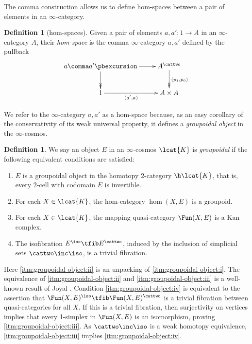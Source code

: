 \documentclass[12pt,reqno]{amsart}
\theoremstyle{plain}
\theoremstyle{definition}
\newtheorem{defn}[thm]{Definition}
\theoremstyle{remark}
\numberwithin{equation}{subsection}
\begin{document}
The comma construction allows us to define hom-spaces between a pair of elements in an $\infty$-category.

\begin{defn}[hom-spaces]\label{defn:hom-space} Given a pair of elements $a,a' \colon 1\to A$ in an $\infty$-category $A$, their \emph{hom-space} is the comma $\infty$-category $a \comma a'$ defined by the pullback
\[ \xymatrix{ a \comma a' \ar@{->>}[d] \ar[r] \pbexcursion & A^\cattwo \ar@{->>}[d]^{(p_1,p_0)} \\ 1 \ar[r]_-{(a',a)} & A \times A}\] 
\end{defn}

We refer to the $\infty$-category $a \comma a'$ as a hom-space because, as an easy corollary of the conservativity of its weak universal property,  it defines a \emph{groupoidal object} in the $\infty$-cosmos.

\begin{defn}\label{defn:groupoidal-object} We say an object $E$ in an $\infty$-cosmos $\lcat{K}$ is \emph{groupoidal} if the following equivalent conditions are satisfied:
\begin{enumerate}[label=(\roman*)]
\item\label{itm:groupoidal-object:i} $E$ is a groupoidal object in the homotopy 2-category $\h\lcat{K}$, that is,  every 2-cell with codomain $E$ is invertible.
\item\label{itm:groupoidal-object:ii} For each $X \in \lcat{K}$, the hom-category $\hom(X,E)$ is a groupoid. 
\item\label{itm:groupoidal-object:iii}  For each $X \in \lcat{K}$, the mapping quasi-category $\Fun(X,E)$ is a Kan complex.
\item\label{itm:groupoidal-object:iv} The isofibration $E^\iso \tfib E^\cattwo$, induced by the inclusion of simplicial sets $\cattwo\inc\iso$, is a trivial fibration.
\end{enumerate}
Here \ref{itm:groupoidal-object:ii} is an unpacking of \ref{itm:groupoidal-object:i}. The equivalence of \ref{itm:groupoidal-object:ii} and \ref{itm:groupoidal-object:iii} is a well-known result of Joyal \cite[1.4]{Joyal:2002:QuasiCategories}. Condition \ref{itm:groupoidal-object:iv} is equivalent to the assertion that $\Fun(X,E)^\iso \tfib \Fun(X,E)^\cattwo$ is a trivial fibration between quasi-categories for all $X$. If this is a trivial fibration, then surjectivity on vertices implies that every 1-simplex in $\Fun(X,E)$ is an isomorphism, proving \ref{itm:groupoidal-object:iii}. As $\cattwo \inc\iso$ is a weak homotopy equivalence, \ref{itm:groupoidal-object:iii} implies  \ref{itm:groupoidal-object:iv}.
\end{defn}
\end{document}
